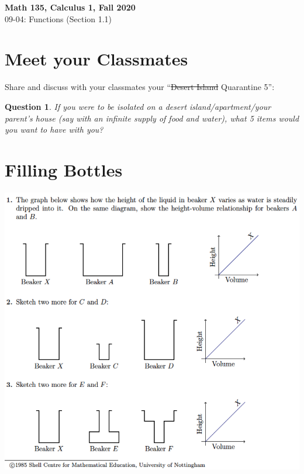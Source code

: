 \documentclass[11pt,reqno,final]{amsart}
\numberwithin{equation}{section}
\numberwithin{figure}{section}
\newtheorem{question}{Question}
\theoremstyle{definition} %
\begin{document}
\begin{center}
        \textbf{\Large Math 135, Calculus 1, Fall 2020}\\[10pt]
        {\large 09-04: Functions (Section 1.1)}
\end{center}

\thispagestyle{empty}



\renewcommand{\thesection}{\Alph{section}}
\section{Meet your Classmates}

Share and discuss with your classmates your ``\sout{Desert Island} Quarantine 5'':
\begin{question}
        If you were to be isolated on a desert island/apartment/your parent's house (say with an infinite supply of food and water), what 5 items would you want to have with you?
\end{question}
\vfill

\section{Filling Bottles}
\includegraphics[width=\textwidth]{09-04P_FillingBottles1}

\newpage
{}
\end{document}

